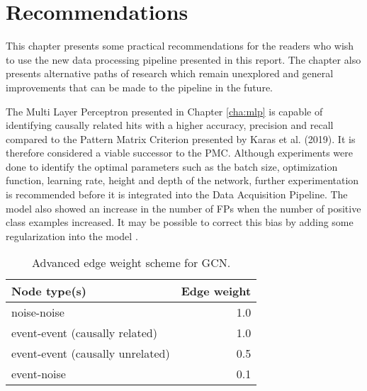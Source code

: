 
\chapter{Recommendations} %
\label{cha:rec}

%

This chapter presents some practical recommendations for the readers
who wish to use the new data processing pipeline presented in this
report. The chapter also presents alternative paths of research which
remain unexplored and general improvements that can be made to the
pipeline in the future.

The Multi Layer Perceptron presented in Chapter \ref{cha:mlp} is
capable of identifying causally related hits with a higher accuracy,
precision and recall compared to the Pattern Matrix Criterion
presented by Karas et al. (2019). It is therefore considered a viable
successor to the PMC. Although experiments were done to identify the
optimal parameters such as the batch size, optimization function,
learning rate, height and depth of the network, further
experimentation is recommended before it is integrated into the Data
Acquisition Pipeline. The model also showed an increase in the number
of FPs when the number of positive class examples increased. It may be
possible to correct this bias by adding some regularization into the
model \cite{Goodfellow-et-al-2016}.

\begin{table}[htb]
  \centering
  \caption{Advanced edge weight scheme for GCN.}
  \begin{tabular}{lr}
    \hline
    Node type(s) & Edge weight \\
    \hline
    noise-noise & 1.0 \\
    event-event (causally related) & 1.0 \\
    event-event (causally unrelated) & 0.5 \\
    event-noise & 0.1 \\
    \hline
  \end{tabular}
  \label{tab:gcn-adv-weights}
\end{table}

